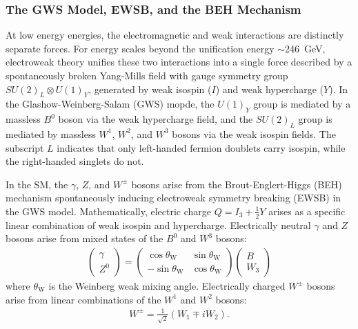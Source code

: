 \subsubsection{The GWS Model, EWSB, and the BEH Mechanism}
At low energy energies, the electromagnetic and weak interactions are distinctly separate forces.
For energy scales beyond the unification energy $\sim$\SI{246}{\GeV}, electroweak theory unifies these two interactions into a single force described by a spontaneously broken Yang-Mills field with gauge symmetry group $SU(2)_L \otimes U(1)_Y$, generated by weak isospin ($I$) and weak hypercharge ($Y$).
In the Glashow-Weinberg-Salam (GWS) mopde, the $U(1)_Y$ group is mediated by a massless $B^0$ boson via the weak hypercharge field, and the $SU(2)_L$ group is mediated by massless $W^1$, $W^2$, and $W^3$ bosons via the weak isospin fields.
The subscript $L$ indicates that only left-handed fermion doublets carry isospin, while the right-handed singlets do not.

In the SM, the $\gamma$, $Z$, and $W^\pm$ bosons arise from the Brout-Englert-Higgs (BEH) mechanism spontaneously inducing electroweak symmetry breaking (EWSB) in the GWS model.
Mathematically, electric charge $Q = I_3 + \frac{1}{2} Y$ arises as a specific linear combination of weak isospin and hypercharge.
Electrically neutral $\gamma$ and $Z$ bosons arise from mixed states of the $B^0$ and $W^3$ bosons:
\begin{align}
\left(\begin{array}{c}
\gamma \\
Z^0
\end{array}\right)=\left(\begin{array}{cc}
\cos \theta_{\mathrm{W}} & \sin \theta_{\mathrm{W}} \\
-\sin \theta_{\mathrm{W}} & \cos \theta_{\mathrm{W}}
\end{array}\right)\left(\begin{array}{c}
B \\
W_3
\end{array}\right)
\label{}
\end{align}
where $\theta_{\mathrm{W}}$ is the Weinberg weak mixing angle.
Electrically charged $W^\pm$ bosons arise from linear combinations of the $W^1$ and $W^2$ bosons:
\begin{align}
W^{\pm}=\frac{1}{\sqrt{2}}\left(W_1 \mp i W_2\right).
\label{}
\end{align}

